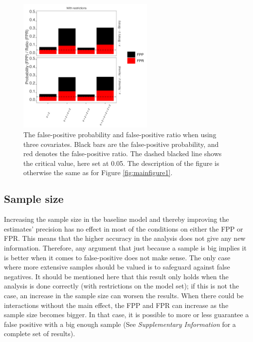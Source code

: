 \begin{figure}[hbt!]
\includegraphics[width=0.6\textwidth]{R/Analysis/Result/Figures/Figure1C_with.jpeg}
\centering
\caption{The false-positive probability and false-positive ratio when using three covariates. Black bars are the false-positive probability, and red denotes the false-positive ratio. The dashed blacked line shows the critical value, here set at 0.05. The description of the figure is otherwise the same as for Figure \ref{fig:mainfigure1}.}
\label{fig:mainfigure2}
\end{figure}

\subsection{Sample size}
Increasing the sample size in the baseline model and thereby improving the estimates' precision has no effect in most of the conditions on either the FPP or FPR. This means that the higher accuracy in the analysis does not give any new information. Therefore, any argument that just because a sample is big implies it is better when it comes to false-positive does not make sense. The only case where more extensive samples should be valued is to safeguard against false negatives. It should be mentioned here that this result only holds when the analysis is done correctly (with restrictions on the model set); if this is not the case, an increase in the sample size can worsen the results. When there could be interactions without the main effect, the FPP and FPR can increase as the sample size becomes bigger. In that case, it is possible to more or less guarantee a false positive with a big enough sample (See \textit{Supplementary Information} for a complete set of results).


